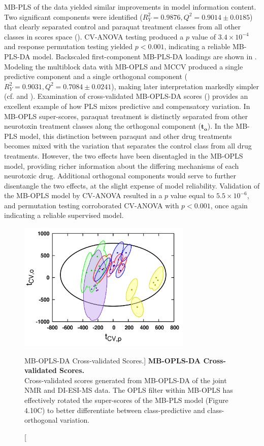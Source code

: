 \begin{doublespace}
MB-PLS of the data yielded similar improvements in model information content.
Two significant components were identified
($R^2_Y = 0.9876, Q^2 = 0.9014 \pm 0.0185$) that clearly separated control and
paraquat treatment classes from all other classes in scores space
(). CV-ANOVA testing produced a $p$ value
of $3.4 \times 10^{-4}$ and response permutation testing yielded
$p < 0.001$, indicating a reliable MB-PLS-DA model. Backscaled
first-component MB-PLS-DA loadings are shown in .
Modeling the multiblock data with MB-OPLS and MCCV produced a
single predictive component and a single orthogonal component
($R^2_Y = 0.9031, Q^2 = 0.7084 \pm 0.0241$), making later interpretation
markedly simpler (cf.  and ).
Examination of cross-validated MB-OPLS-DA scores
() provides an excellent example of how PLS mixes
predictive and compensatory variation. In MB-OPLS super-scores, paraquat
treatment is distinctly separated from other neurotoxin treatment classes along
the orthogonal component ($\mathbf{t_o}$). In the MB-PLS model, this
distinction between paraquat and other drug treatments becomes mixed with the
variation that separates the control class from all drug treatments. However,
the two effects have been disentagled in the MB-OPLS model, providing richer
information about the differing mechanisms of each neurotoxic drug. Additional
orthogonal components would serve to further disentangle the two effects, at
the slight expense of model reliability. Validation of the MB-OPLS model by
CV-ANOVA resulted in a $p$ value equal to $5.5 \times 10^{-6}$, and permutation
testing corroborated CV-ANOVA with $p < 0.001$, once again indicating a
reliable supervised model.
\end{doublespace}

\begin{figure}
\includegraphics[width=3.25in]{figs/apps/14-mbopls-t.png}
\caption
      [MB-OPLS-DA Cross-validated Scores.]{
  {\bf MB-OPLS-DA Cross-validated Scores.}
  \\
  Cross-validated scores generated from MB-OPLS-DA of the joint \hnmr{} NMR
  and DI-ESI-MS data. The OPLS filter within MB-OPLS has effectively rotated
  the super-scores of the MB-PLS model (Figure 4.10C) to better differentiate
  between class-predictive and class-orthogonal variation.
}
\label{figure.4.14}
\end{figure}

